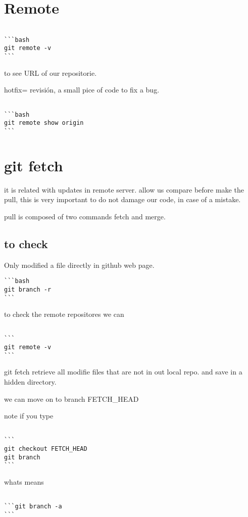 \documentclass[10pt,a4paper]{article}
\begin{document}
\section{Remote}

\begin{verbatim}

```bash
git remote -v
```

\end{verbatim}
to see URL of our repositorie.

hotfix= revisión, a small pice of code to fix a bug.
\begin{verbatim}

```bash
git remote show origin  
```

\end{verbatim}


\section{git fetch}
it is related with updates in remote server.
allow us compare before make the pull, this is very important to do not damage our code, in case of a mistake.

pull is composed of two commands fetch and merge.


\subsection{to check}

Only modified a file directly in github web page.

\begin{verbatim}
```bash
git branch -r
```
\end{verbatim}

to check the remote repositores we can 

\begin{verbatim}

```
git remote -v
``` 
\end{verbatim}

git fetch retrieve all modifie files that are not
in out local repo. and save in a hidden directory.

we can move on to branch FETCH\_HEAD

note if you type
\begin{verbatim}

```
git checkout FETCH_HEAD
git branch 
``` 
\end{verbatim}


whats means 
\begin{verbatim}

```git branch -a
```
\end{verbatim}
\end{document}
